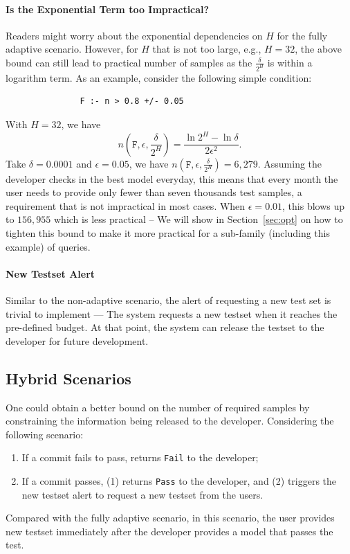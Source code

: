 \documentclass{article}
\begin{document}
\paragraph*{Is the Exponential Term too Impractical?} 
Readers might worry about the exponential dependencies
on $H$ for the fully adaptive scenario. However, 
for $H$ that is not too large, e.g., $H=32$, 
the above bound can still lead to practical 
number of samples as the $\frac{\delta}{2^H}$ is
within a logarithm term. As an example, consider the
following simple condition:
\begin{verbatim}
               F :- n > 0.8 +/- 0.05
\end{verbatim}
With $H=32$, we have
\[
n(\texttt{F}, \epsilon, \frac{\delta}{2^H}) = \frac{\ln 2^H - \ln \delta}{2\epsilon^2}.
\]
Take $\delta = 0.0001$ and $\epsilon = 0.05$, 
we have $n(\texttt{F}, \epsilon, \frac{\delta}{2^H}) = 6,279$. Assuming the developer checks in the best model
everyday, this means that every month the user needs
to provide only fewer than seven thousands test samples,
a requirement that is not impractical in most cases.
When $\epsilon = 0.01$, this blows up to $156,955$ which
is less practical -- We will show in Section~\ref{sec:opt}
on how to tighten this bound to make it more practical 
for a sub-family (including this example) of queries.

\paragraph*{New Testset Alert} Similar to the non-adaptive
scenario, the alert of requesting a new test set is 
trivial to implement --- The system requests a new
testset when it reaches the pre-defined budget. At that
point, the system can release the testset to the developer
for future development.

\subsection{Hybrid Scenarios}

One could obtain a better bound on the number of required
samples by constraining the information being released
to the developer. Considering the following scenario:
\begin{enumerate}
\item If a commit fails to pass, returns \texttt{Fail} to the developer;
\item If a commit passes, (1) returns \texttt{Pass} to the developer, and (2) triggers the new testset alert to request
a new testset from the users.
\end{enumerate}
Compared with the fully adaptive scenario, in this
scenario, the user provides new testset immediately
after the developer provides a model that passes the 
test. 
\end{document}
